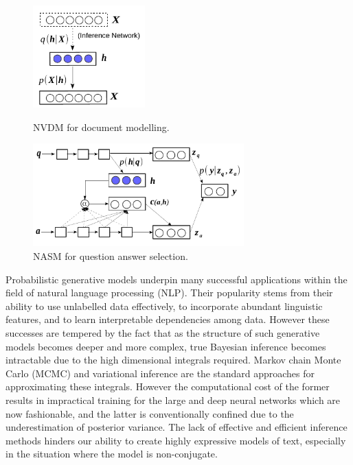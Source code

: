 \documentclass{article}
\begin{document}
\begin{figure}[htb]
\vspace{-0.5em}
\begin{minipage}[t]{0.5\linewidth}
  \centering
	\includegraphics[width=1.7in]{1_vtm_new.pdf}
	\vspace{-1em}
\caption{NVDM for document modelling.}
\label{fig:vtm}
\end{minipage}%
\begin{minipage}[t]{0.5\linewidth}
  \centering
	\includegraphics[width=3.2in]{3_nasm_new.pdf}
	\vspace{-1em}
\caption{NASM for question answer selection.}
\label{fig:vsm}
\end{minipage}
\vspace{-1em}
\end{figure}

Probabilistic generative models underpin many successful applications within the field of natural language processing (NLP). 
Their popularity stems from their ability to use unlabelled data effectively, to incorporate abundant linguistic features, and to learn interpretable dependencies among data.
However these successes are tempered by the fact that as the structure of such generative models becomes deeper and more complex, true Bayesian inference becomes intractable due to the high dimensional integrals required. 
Markov chain Monte Carlo (MCMC) \citep{neal1993probabilistic,andrieu2003introduction} and variational inference \citep{jordan1999introduction,attias2000variational,beal2003variational} are the standard approaches for approximating these integrals. 
However the computational cost of the former results in impractical training for the large and deep neural networks which are now fashionable, and the latter is conventionally confined due to the underestimation of posterior variance.
The lack of effective and efficient inference methods hinders our ability to create highly expressive models of text, especially in the situation where the model is non-conjugate. 
\end{document}
